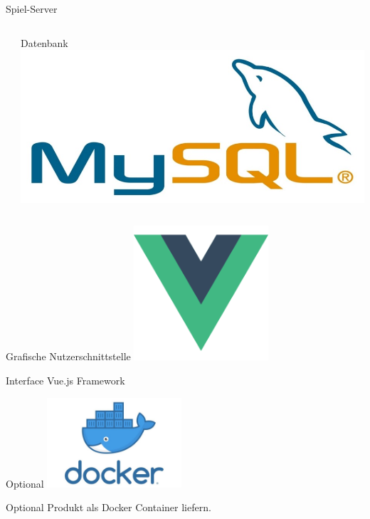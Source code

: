 \documentclass[xcolor=dvipsnames]{beamer}
\begin{document}
\begin{frame}{Spiel-Server}
\begin{columns}
\begin{column}{0.5\textwidth}
\end{column}
\begin{column}{0.5\textwidth}  %
        \begin{block}{Datenbank}
                \includegraphics[width=\textwidth]{img/MySQL.jpg}
    \end{block}
\end{column}
\end{columns}
\end{frame}
\begin{frame}{Grafische Nutzerschnittstelle}
    \centering
        \includegraphics[width=5cm]{img/vue.png}
        \begin{block}{Interface}
        Vue.js Framework
        \end{block}
\end{frame}
\begin{frame}{Optional}
    \centering
         \includegraphics[width=5cm]{img/docker.jpg}
         \begin{block}{Optional}
          Produkt als Docker Container liefern.
        \end{block}
\end{frame}
\end{document}
